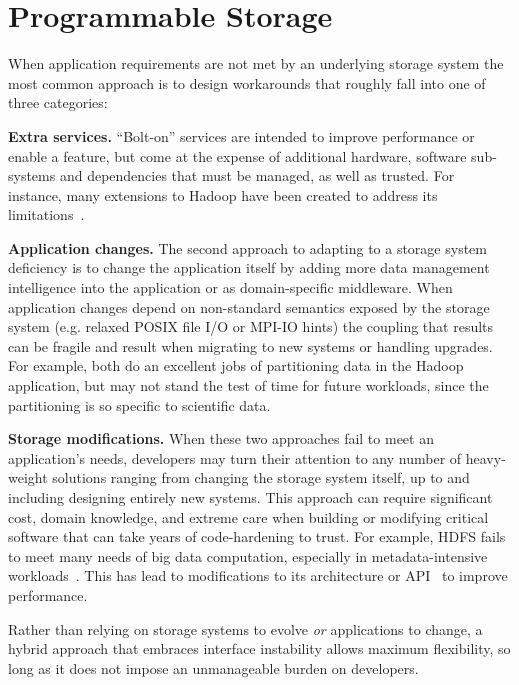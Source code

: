 \section{Programmable Storage}
\label{sec:progly}

When application requirements are not met by an underlying storage system the
most common approach is to design workarounds that roughly fall into one
of three categories:

{\bf Extra services.} ``Bolt-on'' services are intended to improve performance
or enable a feature, but come at the expense of additional hardware, software
sub-systems and dependencies that must be managed, as well as trusted.
For instance, many extensions to Hadoop have been created to address its
limitations~\cite{bu:vldb2010-haloop, ekanayake:hpdc2010-twister,
ekanayake:escience2008-eglmapreduce, mihailescu:hotstorage2012-mixapart}.

{\bf Application changes.} The second approach to adapting to a storage system
deficiency is to change the application itself by adding more data management
intelligence into the application or as domain-specific middleware. When
application changes depend on non-standard semantics exposed by the storage
system (e.g. relaxed POSIX file I/O or MPI-IO hints) the coupling that results
can be fragile and result when migrating to new systems or handling upgrades.
For example, \cite{buck:hpc2011-scihadoop, gkantsidis:nsdi2013-rhea} both do
an excellent jobs of partitioning data in the Hadoop application, but may not
stand the test of time for future workloads, since the partitioning is so
specific to scientific data.

{\bf Storage modifications.} When these two approaches fail to meet an
application's needs, developers may turn their attention to any number of
heavy-weight solutions ranging from changing the storage system itself, up to
and including designing entirely new systems. This approach can require
significant cost, domain knowledge, and extreme care when building or
modifying critical software that can take years of code-hardening to trust.
For example, HDFS fails to meet many needs of big data computation, especially
in metadata-intensive workloads~\cite{shvachko:login2012-hdfs-scalability}.
This has lead to modifications to its architecture or
API~\cite{balmin:sigmod2012-clydesdale} to improve performance.

Rather than relying on storage systems to evolve \emph{or} applications to
change, a hybrid approach that embraces interface instability allows maximum
flexibility, so long as it does not impose an unmanageable burden on
developers.

